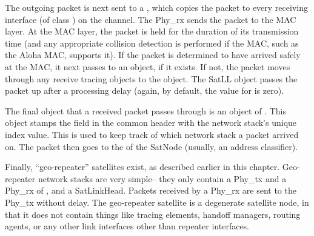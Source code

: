 The outgoing packet is next sent to a , which copies the
packet to every receiving interface (of class ) on the channel. 
The Phy\_rx sends the packet to the MAC layer.  At the MAC layer, the packet
is held for the duration of its transmission time (and any appropriate
collision detection is performed if the MAC, such as the Aloha MAC,
supports it).  If the packet is determined to have arrived safely at the MAC,
it next passes to an  object, if it exists.  If not, the
packet moves through any receive tracing objects to the 
object.  The SatLL object passes the packet up after a processing delay
(again, by default, the value for  is zero).

The final object that a received packet passes through is an object of
.  This object stamps the  field
in the common header with the network stack's unique index value.  This
is used to keep track of which network stack a packet arrived on.  The
packet then goes to the  of the SatNode (usually, an address
classifier).  

Finally, ``geo-repeater'' satellites exist, as described earlier in this
chapter.  Geo-repeater network stacks are very simple-- they only contain
a Phy\_tx and a Phy\_rx of , and a SatLinkHead.  
Packets received by a Phy\_rx are sent to the Phy\_tx without delay.  The
geo-repeater satellite is a degenerate satellite node, in that it does not
contain things like tracing elements, handoff managers, routing agents, or 
any other link interfaces other than repeater interfaces.

\endinput


